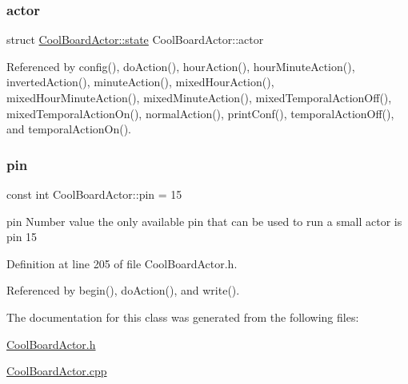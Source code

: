 \subsubsection{\texorpdfstring{actor}{actor}}
{\footnotesize\ttfamily struct \hyperlink{class_cool_board_actor_d5/ddc/struct_cool_board_actor_1_1state}{Cool\+Board\+Actor\+::state} Cool\+Board\+Actor\+::actor\hspace{0.3cm}{\ttfamily [private]}}



Referenced by config(), do\+Action(), hour\+Action(), hour\+Minute\+Action(), inverted\+Action(), minute\+Action(), mixed\+Hour\+Action(), mixed\+Hour\+Minute\+Action(), mixed\+Minute\+Action(), mixed\+Temporal\+Action\+Off(), mixed\+Temporal\+Action\+On(), normal\+Action(), print\+Conf(), temporal\+Action\+Off(), and temporal\+Action\+On().

\mbox{\label{class_cool_board_actor_a8b5c0b41fe6033b68d9e1ed00bc2e122}} 
\subsubsection{\texorpdfstring{pin}{pin}}
{\footnotesize\ttfamily const int Cool\+Board\+Actor\+::pin = 15\hspace{0.3cm}{\ttfamily [private]}}

pin Number value the only available pin that can be used to run a small actor is pin 15 

Definition at line 205 of file Cool\+Board\+Actor.\+h.



Referenced by begin(), do\+Action(), and write().



The documentation for this class was generated from the following files\+:\begin{DoxyCompactItemize}
\item 
\hyperlink{_cool_board_actor_8h}{Cool\+Board\+Actor.\+h}\item 
\hyperlink{_cool_board_actor_8cpp}{Cool\+Board\+Actor.\+cpp}\end{DoxyCompactItemize}
